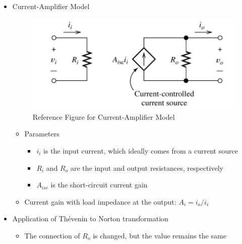\begin{itemize}

  \item Current-Amplifier Model

    \begin{figure}[H]
      \centering
      \includegraphics[width=.7\textwidth]{Images/CAM.png}
      \caption{Reference Figure for Current-Amplifier Model}
      \label{fig:1}
    \end{figure}

    \begin{itemize}

      \item Parameters

        \begin{itemize}

          \item $i_i$ is the input current, which ideally comes from a current source

          \item $R_i$ and $R_o$ are the input and output resistances, respectively

          \item $A_{isc}$ is the short-circuit current gain

        \end{itemize}

      \item Current gain with load impedance at the output: $A_i=i_o/i_i$

    \end{itemize}

  \item Application of Th\'evenin to Norton transformation

    \begin{itemize}

      \item The connection of $R_o$ is changed, but the value remains the same

    \end{itemize}


\end{itemize}
